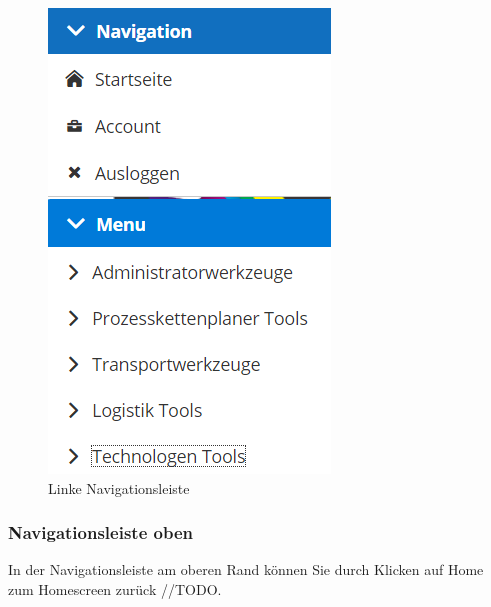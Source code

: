 \documentclass[enabledeprecatedfontcommands,fontsize=12pt,paper=a4,twoside]{scrartcl}
\begin{document}
\begin{figure}[h!]
\begin{center}
 \includegraphics[width=\textwidth]{screenshots/allgemein/navigationlinks.png}
  \caption{Linke Navigationsleiste}
  \label{fig:boat1}
\end{center}
\end{figure}


\subsubsection{Navigationsleiste oben}
In der Navigationsleiste am oberen Rand können Sie durch Klicken auf Home zum Homescreen zurück //TODO.  \\
\end{document}

